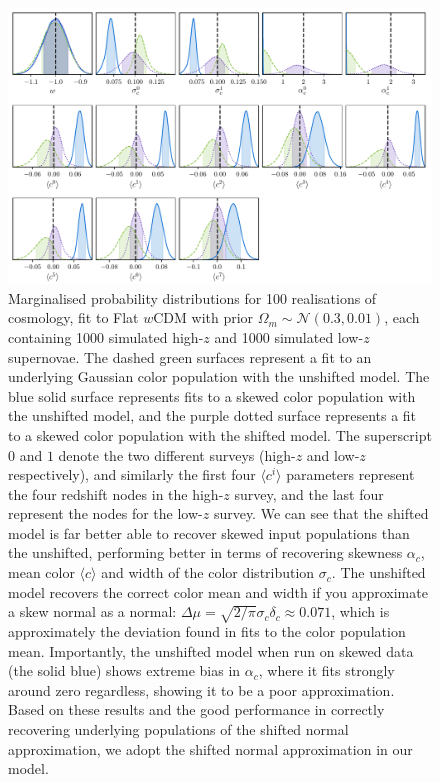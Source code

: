 \documentclass[a4paper,fleqn,usenatbib,manuscript]{emulateapj}
\begin{document}
\begin{figure}
	\begin{center}
		\includegraphics[width=\textwidth]{simple_w_shift_dist_0.pdf}
	\end{center}
	\caption{Marginalised probability distributions for 100 realisations of cosmology, fit to Flat $w$CDM with prior $\Omega_m \sim \mathcal{N}(0.3, 0.01)$, each containing 1000 simulated high-$z$ and 1000 simulated low-$z$ supernovae. The dashed green surfaces represent a fit to an underlying Gaussian color population with the unshifted model. The blue solid surface represents fits to a skewed color population with the unshifted model, and the purple dotted surface represents a fit to a skewed color population with the shifted model. The superscript $0$ and $1$ denote the two different surveys (high-$z$ and low-$z$ respectively), and similarly the first four $\langle c^i \rangle$ parameters represent the four redshift nodes in the high-$z$ survey, and the last four represent the nodes for the low-$z$ survey. We can see that the shifted model is far better able to recover skewed input populations than the unshifted, performing better in terms of recovering skewness $\alpha_c$, mean color $\langle c \rangle$ and width of the color distribution $\sigma_c$. The unshifted model recovers the correct color mean and width if you approximate a skew normal as a normal: $\Delta\mu = \sqrt{2/\pi}\sigma_c\delta_c \approx 0.071$, which is approximately the deviation found in fits to the color population mean. Importantly, the unshifted model when run on skewed data (the solid blue) shows extreme bias in $\alpha_c$, where it fits strongly around zero regardless, showing it to be a poor approximation. Based on these results and the good performance in correctly recovering underlying populations of the shifted normal approximation, we adopt the shifted normal approximation in our model.}
	\label{fig:simple_w_super}
\end{figure}
\end{document}
